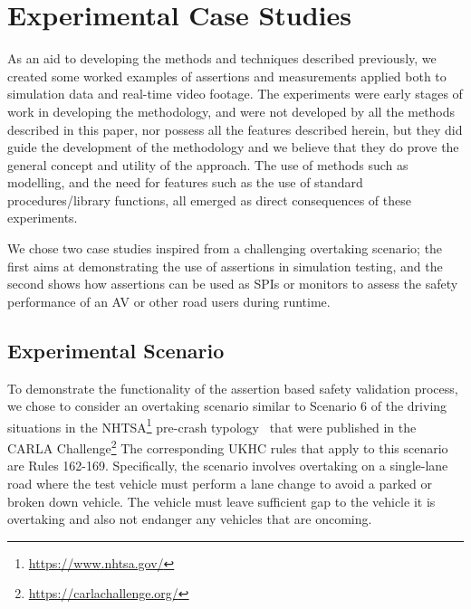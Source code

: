 \section{Experimental Case Studies} \label{Experimental_scenario}
As an aid to developing the methods and techniques described previously, we created some worked examples of assertions and measurements applied both to simulation data and real-time video footage. The experiments were early stages of work in developing the methodology, and were not developed by all the methods described in this paper, nor possess all the features described herein, but they did guide the development of the methodology and we believe that they do prove the general concept and utility of the approach. The use of methods such as modelling, and the need for features such as the use of standard procedures/library functions, all emerged as direct consequences of these experiments.

We chose two case studies inspired from a challenging overtaking scenario; the first aims at demonstrating the use of assertions in simulation testing, and the second shows how assertions can be used as SPIs or monitors to assess the safety performance of an AV or other road users during runtime.

\subsection{Experimental Scenario} %
\label{carla_challenge}
To demonstrate the functionality of the assertion based safety validation process, we chose to consider an overtaking scenario similar to Scenario 6 of the driving situations in the NHTSA\footnote{\url{https://www.nhtsa.gov/}} pre-crash typology~\cite{nhtsa_precrash} that were published in the CARLA Challenge\footnote{\url{https://carlachallenge.org/}} The corresponding UKHC rules \cite{highwayCode} that apply to this scenario are Rules 162-169. Specifically, the scenario involves overtaking on a single-lane road where the test vehicle must perform a lane change to avoid a parked or broken down vehicle. 
The vehicle must leave sufficient gap to the vehicle it is overtaking and also not endanger any vehicles that are oncoming.


